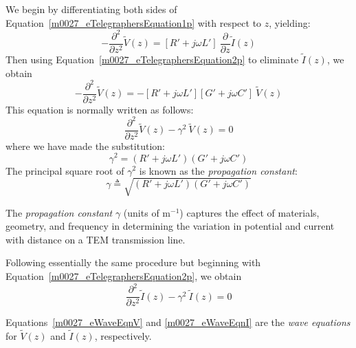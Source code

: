 We begin by differentiating both sides of Equation~\ref{m0027_eTelegraphersEquation1p} with respect to $z$, yielding:
%
\begin{equation}
-\frac{\partial^2}{\partial z^2} \widetilde{V}(z) = \left[ R' + j\omega L' \right]~\frac{\partial}{\partial z} \widetilde{I}(z)
\end{equation}
%
Then using Equation~\ref{m0027_eTelegraphersEquation2p} to eliminate $\widetilde{I}(z)$, we obtain
%
\begin{equation}
-\frac{\partial^2}{\partial z^2} \widetilde{V}(z) = -\left[ R' + j\omega L' \right]\left[ G' + j\omega C' \right]~\widetilde{V}(z)
\end{equation}
%
This equation is normally written as follows:
%
\begin{equation}
\boxed{
\frac{\partial^2}{\partial z^2} \widetilde{V}(z) -\gamma^2~\widetilde{V}(z) =0
}
\label{m0027_eWaveEqnV}
\end{equation}
%
where we have made the substitution:
%
\begin{equation}
\gamma^2 = \left( R' + j\omega L' \right)\left( G' + j\omega C' \right)
\end{equation}
%
The principal square root of $\gamma^2$ is known as the \emph{propagation constant}:
%
\begin{equation}
\gamma \triangleq \sqrt{\left( R' + j\omega L' \right)\left( G' + j\omega C' \right)} 
\label{m0027_egamma}
\end{equation}
%
\begin{mdframed}[backgroundcolor=yellow!20,nobreak=true] 
The \emph{propagation constant} 
$\gamma$ (units of m$^{-1}$) captures the effect of materials, geometry, and frequency in determining the variation in potential and current with distance on a TEM transmission line. 
\end{mdframed}

Following essentially the same procedure but beginning with Equation~\ref{m0027_eTelegraphersEquation2p}, we obtain
%
\begin{equation}
\boxed{
\frac{\partial^2}{\partial z^2} \widetilde{I}(z) -\gamma^2~\widetilde{I}(z) =0
}
\label{m0027_eWaveEqnI}
\end{equation}
%
\begin{mdframed}[backgroundcolor=yellow!20,nobreak=true] 
Equations~\ref{m0027_eWaveEqnV} and \ref{m0027_eWaveEqnI} are the \emph{wave equations} for $\widetilde{V}(z)$ and $\widetilde{I}(z)$, respectively.
\end{mdframed}

